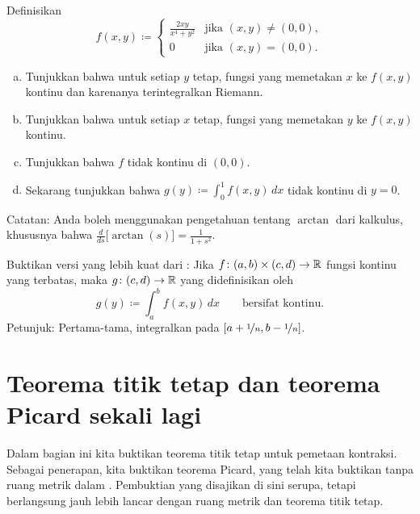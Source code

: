 \begin{exercise}
Definisikan
\begin{equation*}
f(x,y) \coloneqq
\begin{cases}
\frac{2xy}{x^4+y^2} & \text{jika } (x,y) \neq (0,0), \\
0 & \text{jika } (x,y) = (0,0) .
\end{cases}
\end{equation*}
\begin{enumerate}[a)]
\item
Tunjukkan bahwa untuk setiap $y$ tetap, fungsi yang memetakan $x$ ke $f(x,y)$
kontinu dan karenanya terintegralkan Riemann.
\item
Tunjukkan bahwa untuk setiap $x$ tetap, fungsi yang memetakan $y$ ke $f(x,y)$ kontinu.
\item
Tunjukkan bahwa $f$ tidak kontinu di $(0,0)$.
\item
Sekarang tunjukkan bahwa $g(y) \coloneqq \int_0^1 f(x,y)\,dx$ tidak kontinu di $y=0$.
\end{enumerate}
Catatan: Anda boleh menggunakan pengetahuan tentang $\arctan$ dari kalkulus,
khususnya bahwa $\frac{d}{ds} \bigl[ \arctan(s) \bigr] = \frac{1}{1+s^2}$.
\end{exercise}

\begin{exercise} \label{exercise:integralcontcontextra}
Buktikan versi yang lebih kuat dari :
Jika $f \colon (a,b) \times (c,d) \to {\mathbb{R}}$ fungsi kontinu yang terbatas,
maka $g \colon (c,d) \to {\mathbb{R}}$ yang didefinisikan oleh
\begin{equation*}
g(y) \coloneqq \int_a^b f(x,y) \,dx  \qquad \text{bersifat kontinu}.
\end{equation*}
Petunjuk: Pertama-tama, integralkan pada $[a+\nicefrac{1}{n},b-\nicefrac{1}{n}]$.
\end{exercise}


\sectionnewpage
\section{Teorema titik tetap dan teorema Picard sekali lagi}
\label{sec:metpicard}



Dalam bagian ini kita buktikan teorema titik tetap untuk pemetaan
kontraksi.  Sebagai penerapan, kita buktikan teorema Picard, yang telah kita buktikan
tanpa ruang metrik dalam .
Pembuktian yang disajikan di sini serupa, tetapi berlangsung jauh
lebih lancar dengan ruang metrik dan teorema titik tetap.

